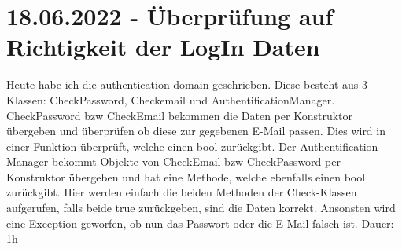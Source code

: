 \documentclass[letterpaper,10pt]{article}
\begin{document}
\section{18.06.2022 - Überprüfung auf Richtigkeit der LogIn Daten}
Heute habe ich die authentication domain geschrieben. Diese besteht aus 3 Klassen: CheckPassword, Checkemail und AuthentificationManager. CheckPassword bzw CheckEmail bekommen die Daten per Konstruktor übergeben und überprüfen ob diese zur gegebenen E-Mail passen. Dies wird in einer Funktion überprüft, welche einen bool zurückgibt. Der Authentification Manager bekommt Objekte von CheckEmail bzw CheckPassword per Konstruktor übergeben und hat eine Methode, welche ebenfalls einen bool zurückgibt. Hier werden einfach die beiden Methoden der Check-Klassen aufgerufen, falls beide true zurückgeben, sind die Daten korrekt. Ansonsten wird eine Exception geworfen, ob nun das Passwort oder die E-Mail falsch ist. Dauer: 1h
\printbibliography
\end{document}

